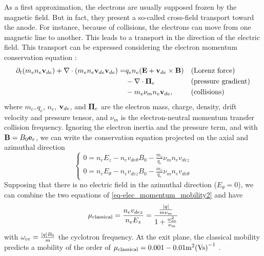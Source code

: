   As a first approximation, the electrons are usually supposed frozen by the magnetic field.
  But in fact, they present a so-called cross-field transport toward the anode.
  For instance, because of collisions, the electrons can move from one magnetic line to another.
  This leads to a transport in the direction of the electric field.
  This transport can be expressed considering the electron momentum conservation equation \citep{lafleur2016a}\string:
  \begin{align*} %
    \partial_t(m_e n_e \vect{v}_{de}) + \div(m_e n_e  \vect{v}_{de} \vect{v}_{de})  = & q_e n_e ( \vect{E} + \vect{v}_{de} \times \vect{B})  &&\text{(Lorenz force)}\\ &- \div \vect{\Pi}_e &&\text{(pressure gradient)}\\ & - m_e \nu_m n_e \vect{v}_{de}, &&\text{(collisions)}
  \end{align*}
  where $m_e, q_e$, $n_e$, ${\mathbf v}_{de}$, and ${\mathbf \Pi}_e $ are the electron mass, charge, density, drift velocity and pressure tensor, and $\nu_m$ is the electron-neutral momentum transfer collision frequency.
  Ignoring the electron inertia and the pressure term, and with ${\mathbf B} = B_0 {\mathbf e}_r$, we can write the conservation equation projected on the axial and azimuthal direction
  \begin{equation} \label{eq-elec_momentum_mobility2}
  \begin{cases}
    0 =  n_e E_z - n_e v_{de{\theta}} B_0 - \frac{m_e}{q_e} \nu_m n_e v_{dez}\\
    0 =  n_e E_{\theta} -  n_e v_{dez} B_0 - \frac{m_e}{q_e} \nu_m n_e v_{de{\theta}}
  \end{cases}
  \end{equation}
  Supposing that there is no electric field in the azimuthal direction ($E_{\theta}=0$),  we can combine the two equations of \cref{eq-elec_momentum_mobility2} and have \citep{chen2006,meezan2001}
  \begin{equation} \label{eq-mobility}
    \mu_{\mathrm{classical}} = \frac{n_e v_{dez}}{n_e E_z} = \frac{ \frac{\lvert q\rvert}{m \nu_m}}{1 + \frac{\omega_{ce}^2}{\nu_m}}
  \end{equation}
  with $\omega_{ce}= \frac{\lvert q\rvert B_0}{m}$ the cyclotron frequency.
  At the exit plane, the classical mobility predicts a mobility of the order of $\mu_{\mathrm{classical}}=0.001-0.01 \text{m}^2\text{(Vs)}^{-1}$ \citep{adam2008a}.
    
